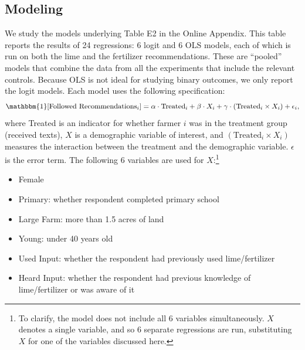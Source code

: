 \documentclass[12pt]{article}
\begin{document}
\subsection{Modeling}
We study the models underlying Table E2 in the \textcite{fabregas_digital_2025} Online Appendix. This table reports the results of 24 regressions: 6 logit and 6 OLS models, each of which is run on both the lime and the fertilizer recommendations. These are ``pooled'' models that combine the data from all the experiments that include the relevant controls. Because OLS is not ideal for studying binary outcomes, we only report the logit models. Each model uses the following specification:
\begin{equation}
    \mathbbm{1}[\text{Followed Recommendations}_i] = \alpha \cdot \text{Treated}_i + \beta \cdot X_i + \gamma \cdot (\text{Treated}_i \times X_i) + \epsilon_i,
\end{equation}
where Treated is an indicator for whether farmer $i$ was in the treatment group (received texts), $X$ is a demographic variable of interest, and $(\text{Treated}_i \times X_i)$ measures the interaction between the treatment and the demographic variable. $\epsilon$ is the error term. The following 6 variables are used for $X$:\footnote{To clarify, the model does not include all 6 variables simultaneously. $X$ denotes a single variable, and so 6 separate regressions are run, substituting $X$ for one of the variables discussed here.}
\begin{itemize}
    \singlespacing
    \item Female
    \item Primary: whether respondent completed primary school
    \item Large Farm: more than 1.5 acres of land
    \item Young: under 40 years old
    \item Used Input: whether the respondent had previously used lime/fertilizer
    \item Heard Input: whether the respondent had previous knowledge of lime/fertilizer or was aware of it
\end{itemize}
\end{document}
